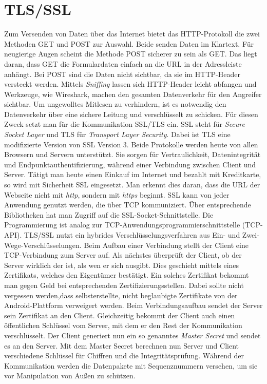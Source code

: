 \section{TLS/SSL}
Zum Versenden von Daten \"uber das Internet bietet das HTTP-Protokoll die zwei Methoden GET und POST zur Auswahl.
Beide senden Daten im Klartext. F\"ur neugierige Augen scheint die Methode POST sicherer zu sein als GET.
Das liegt daran, dass GET die Formulardaten einfach an die URL in der Adressleiste anh\"angt.
Bei POST sind die Daten nicht sichtbar, da sie im HTTP-Header versteckt werden.
Mittels \emph{Sniffing} lassen sich HTTP-Header leicht abfangen und Werkzeuge, wie Wireshark, machen den gesamten Datenverkehr
f\"ur den Angreifer sichtbar.
Um ungewolltes Mitlesen zu verhindern, ist es notwendig den Datenverkehr \"uber eine sichere Leitung und verschl\"usselt zu schicken.
F\"ur diesen Zweck setzt man f\"ur die Kommunikation SSL/TLS ein.
SSL steht f\"ur \emph{Secure Socket Layer} \cite[S. 513]{PHP_MySQL:01}\cite[S. 766]{Sicherheit:04} und TLS f\"ur \emph{Transport Layer Security}\cite{Sicherheit:03}.
Dabei ist TLS eine modifizierte Version von SSL Version 3.
Beide Protokolle werden heute von allen Browsern und Servern unterst\"utzt.
Sie sorgen f\"ur Vertraulichkeit, Datenintegrit\"at und Endpunktauthentifizierung, w\"ahrend einer Verbindung zwischen Client und Server.
T\"atigt man heute einen Einkauf im Internet und bezahlt mit Kreditkarte, so wird mit Sicherheit SSL eingesetzt.
Man erkennt dies daran, dass die URL der Webseite nicht mit \emph{http}, sondern mit \emph{https} beginnt.
SSL kann von jeder Anwendung genutzt werden, die \"uber TCP kommuniziert.
\"Uber entsprechende Bibliotheken hat man Zugriff auf die SSL-Socket-Schnittstelle.
Die Programmierung ist analog zur TCP-Anwendungsprogrammierschnittstelle (TCP-API).
TLS/SSL nutzt ein hybrides Verschl\"usselungsverfahren aus Ein- und Zwei-Wege-Verschl\"usselungen.
Beim Aufbau einer Verbindung stellt der Client eine TCP-Verbindung zum Server auf.
Als n\"achstes \"uberpr\"uft der Client, ob der Server wirklich der ist, als wen er sich ausgibt.
Dies geschieht mittels eines Zertifikats, welches den Eigent\"umer best\"atigt.
Ein solches Zertifikat bekommt man gegen Geld bei entsprechenden Zertifizierungsstellen.
Dabei sollte nicht vergessen werden,dass selbsterstellte, nicht beglaubigte Zertifikate von der Android-Plattform verweigert werden\cite[S. 356]{Android:02}.
Beim Verbindungsaufbau sendet der Server sein Zertifikat an den Client.
Gleichzeitig bekommt der Client auch einen \"offentlichen Schl\"ussel vom Server, mit dem er den Rest der Kommunikation verschl\"usselt.
Der Client generiert nun ein so genanntes \emph{Master Secret} und sendet es an den Server.
Mit dem Master Secret berechnen nun Server und Client verschiedene Schl\"ussel f\"ur Chiffren und die Integrit\"atspr\"ufung.
W\"ahrend der Kommunikation werden die Datenpakete mit Sequenznummern versehen, um sie vor Manipulation von Au\ss{}en zu sch\"utzen.\\



